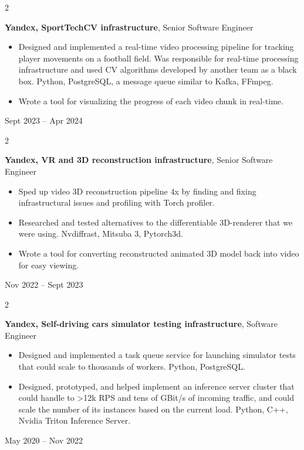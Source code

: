 \documentclass[11pt, letterpaper]{article}
\newenvironment{highlights}{
    \begin{itemize}[
        topsep=0.10 cm,
        parsep=0.10 cm,
        partopsep=0pt,
        itemsep=0pt,
        leftmargin=0.4 cm + 10pt
    ]
}{
    \end{itemize}
} %
\newenvironment{twocolentry}[2][]{
    \onecolentry
    \def\secondColumn{#2}
    \setcolumnwidth{\fill, 4.5 cm}
    \begin{paracol}{2}
}{
    \switchcolumn \raggedleft \secondColumn
    \end{paracol}
    \endonecolentry
} %
\begin{document}
        \begin{twocolentry}{
            Sept 2023 – Apr 2024
        }
            \textbf{Yandex, SportTechCV infrastructure}, Senior Software Engineer
            \begin{highlights}
                \item Designed and implemented a real-time video processing pipeline for tracking player movements on a football field. Was responsible for real-time processing infrastructure and used CV algorithms developed by another team as a black box. Python, PostgreSQL, a message queue similar to Kafka, FFmpeg.
                \item Wrote a tool for visualizing the progress of each video chunk in real-time.
            \end{highlights}
        \end{twocolentry}


        \vspace{0.2 cm}

        \begin{twocolentry}{
            Nov 2022 – Sept 2023
        }
            \textbf{Yandex, VR and 3D reconstruction infrastructure}, Senior Software Engineer
            \begin{highlights}
                \item Sped up video 3D reconstruction pipeline 4x by finding and fixing infrastructural issues and profiling with Torch profiler.
                \item Researched and tested alternatives to the differentiable 3D-renderer that we were using. Nvdiffrast, Mitsuba 3, Pytorch3d.
                \item Wrote a tool for converting reconstructed animated 3D model back into video for easy viewing.
            \end{highlights}
        \end{twocolentry}


        \vspace{0.2 cm}

        \begin{twocolentry}{
            May 2020 – Nov 2022
        }
            \textbf{Yandex, Self-driving cars simulator testing infrastructure}, Software Engineer
            \begin{highlights}
                \item Designed and implemented a task queue service for launching simulator tests that could scale to thousands of workers. Python, PostgreSQL.
                \item Designed, prototyped, and helped implement an inference server cluster that could handle to >12k RPS and tens of GBit/s of incoming traffic, and could scale the number of its instances based on the current load. Python, C++, Nvidia Triton Inference Server.
            \end{highlights}
        \end{twocolentry}
\end{document}
